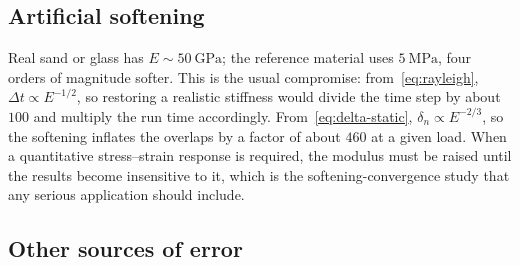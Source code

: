 \subsection{Artificial softening}

Real sand or glass has $E\sim\qty{50}{\giga\pascal}$; the reference material
uses $\qty{5}{\mega\pascal}$, four orders of magnitude softer.  This is the usual
compromise: from~\eqref{eq:rayleigh}, $\Delta t \propto E^{-1/2}$, so restoring a
realistic stiffness would divide the time step by about $100$ and multiply the
run time accordingly.  From~\eqref{eq:delta-static},
$\delta_{n}\propto E^{-2/3}$, so the softening inflates the overlaps by a factor
of about $460$ at a given load.  When a quantitative stress--strain response is
required, the modulus must be raised until the results become insensitive to it,
which is the softening-convergence study that any serious application should
include.

\subsection{Other sources of error}

